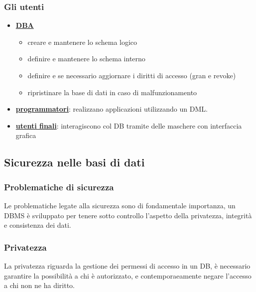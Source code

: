 \documentclass{article}
\begin{document}
\subsubsection{Gli utenti}
\begin{itemize}
    \item \textbf{\underline{DBA}}\begin{itemize}
        \item creare e mantenere lo schema logico
        \item definire e mantenere lo schema interno
        \item definire e se necessario aggiornare i diritti di accesso (gran e revoke)
        \item ripristinare la base di dati in caso di malfunzionamento
    \end{itemize}
    \item \textbf{\underline{programmatori}}: realizzano applicazioni utilizzando un DML.
    \item \textbf{\underline{utenti finali}}: interagiscono col DB tramite delle maschere con interfaccia grafica
\end{itemize}
\subsection{Sicurezza nelle basi di dati}
\subsubsection{Problematiche di sicurezza}
Le problematiche legate alla sicurezza sono di fondamentale importanza, un DBMS è sviluppato per tenere sotto controllo l'aspetto della privatezza, integrità e consistenza dei dati.
\subsubsection{Privatezza}
La privatezza riguarda la gestione dei permessi di accesso in un DB, è necessario garantire la possibilità a chi è autorizzato, e contemporaeamente negare l'accesso a chi non ne ha diritto.
\end{document}
